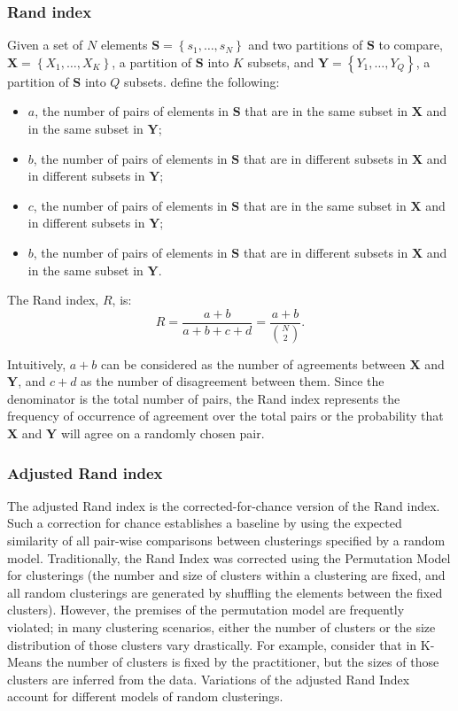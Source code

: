 \documentclass[12pt,a4paper]{article}
\begin{document}
\subsubsection{Rand index}
Given a set of $N$ elements $\mathbf{S}=\left\{s_1,\ldots,s_N\right\}$ and two partitions of $\mathbf{S}$ to compare, $\mathbf{X}=\left\{X_1,\ldots,X_K\right\}$, a partition of $\mathbf{S}$ into $K$ subsets, and $\mathbf{Y}=\left\{Y_1,\ldots,Y_Q\right\}$, a partition of $\mathbf{S}$ into $Q$ subsets. define the following:
\begin{itemize}
	\item $a$, the number of pairs of elements in $\mathbf{S}$ that are in the same subset in $\mathbf{X}$ and in the same subset in $\mathbf{Y}$;
	\item $b$, the number of pairs of elements in $\mathbf{S}$ that are in different subsets in $\mathbf{X}$ and in different subsets in $\mathbf{Y}$;
	\item $c$, the number of pairs of elements in $\mathbf{S}$ that are in the same subset in $\mathbf{X}$ and in different subsets in $\mathbf{Y}$;
	\item $b$, the number of pairs of elements in $\mathbf{S}$ that are in different subsets in $\mathbf{X}$ and in the same subset in $\mathbf{Y}$.
\end{itemize}
The Rand index, $R$, is:
\begin{equation}
R=\frac{a+b}{a+b+c+d}=\frac{a+b}{\binom{N}{2}}.
\end{equation}

Intuitively, $a+b$ can be considered as the number of agreements between $\mathbf{X}$ and $\mathbf{Y}$, and $c+d$ as the number of disagreement between them. Since the denominator is the total number of pairs, the Rand index represents the frequency of occurrence of agreement over the total pairs or the probability that $\mathbf{X}$ and $\mathbf{Y}$ will agree on a randomly chosen pair.

\subsubsection{Adjusted Rand index}
The adjusted Rand index is the corrected-for-chance version of the Rand index. Such a correction for chance establishes a baseline by using the expected similarity of all pair-wise comparisons between clusterings specified by a random model. Traditionally, the Rand Index was corrected using the Permutation Model for clusterings (the number and size of clusters within a clustering are fixed, and all random clusterings are generated by shuffling the elements between the fixed clusters). However, the premises of the permutation model are frequently violated; in many clustering scenarios, either the number of clusters or the size distribution of those clusters vary drastically. For example, consider that in K-Means the number of clusters is fixed by the practitioner, but the sizes of those clusters are inferred from the data. Variations of the adjusted Rand Index account for different models of random clusterings.
\end{document}
